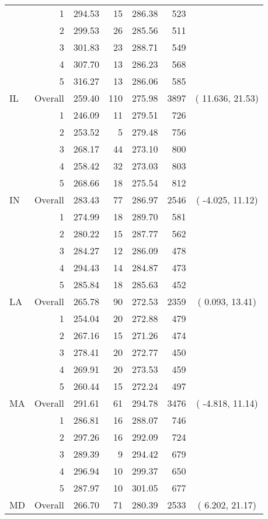 \begin{longtable}{lrrr@{\extracolsep{.25cm}}rrc}
   & 1 & 294.53 &  15 & 286.38 & 523 &  \\ 
   & 2 & 299.53 &  26 & 285.56 & 511 &  \\ 
   & 3 & 301.83 &  23 & 288.71 & 549 &  \\ 
   & 4 & 307.70 &  13 & 286.23 & 568 &  \\ 
   & 5 & 316.27 &  13 & 286.06 & 585 &  \\ 
   \hline
IL & Overall & 259.40 & 110 & 275.98 & 3897 & ( 11.636,  21.53) \\ 
   & 1 & 246.09 &  11 & 279.51 & 726 &  \\ 
   & 2 & 253.52 &   5 & 279.48 & 756 &  \\ 
   & 3 & 268.17 &  44 & 273.10 & 800 &  \\ 
   & 4 & 258.42 &  32 & 273.03 & 803 &  \\ 
   & 5 & 268.66 &  18 & 275.54 & 812 &  \\ 
   \hline
IN & Overall & 283.43 &  77 & 286.97 & 2546 & ( -4.025,  11.12) \\ 
   & 1 & 274.99 &  18 & 289.70 & 581 &  \\ 
   & 2 & 280.22 &  15 & 287.77 & 562 &  \\ 
   & 3 & 284.27 &  12 & 286.09 & 478 &  \\ 
   & 4 & 294.43 &  14 & 284.87 & 473 &  \\ 
   & 5 & 285.84 &  18 & 285.63 & 452 &  \\ 
   \hline
LA & Overall & 265.78 &  90 & 272.53 & 2359 & (  0.093,  13.41) \\ 
   & 1 & 254.04 &  20 & 272.88 & 479 &  \\ 
   & 2 & 267.16 &  15 & 271.26 & 474 &  \\ 
   & 3 & 278.41 &  20 & 272.77 & 450 &  \\ 
   & 4 & 269.91 &  20 & 273.53 & 459 &  \\ 
   & 5 & 260.44 &  15 & 272.24 & 497 &  \\ 
   \hline
MA & Overall & 291.61 &  61 & 294.78 & 3476 & ( -4.818,  11.14) \\ 
   & 1 & 286.81 &  16 & 288.07 & 746 &  \\ 
   & 2 & 297.26 &  16 & 292.09 & 724 &  \\ 
   & 3 & 289.39 &   9 & 294.42 & 679 &  \\ 
   & 4 & 296.94 &  10 & 299.37 & 650 &  \\ 
   & 5 & 287.97 &  10 & 301.05 & 677 &  \\ 
   \hline
MD & Overall & 266.70 &  71 & 280.39 & 2533 & (  6.202,  21.17) \\ 

\end{longtable}
